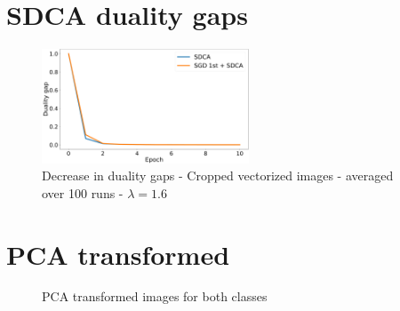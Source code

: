 \documentclass[10pt,a4paper]{article}
\begin{document}
\newpage

\FloatBarrier

\section{SDCA duality gaps}

\begin{figure}[!htb]
	\centering
	\includegraphics[width=0.55\textwidth]{Graphs/duality_original3_mc100.pdf}
  \caption{Decrease in duality gaps - Cropped vectorized images - averaged over 100 runs - $\lambda = 1.6$}\label{find_centre}
\end{figure}

\FloatBarrier
\section{PCA transformed}

\begin{figure}[!htb]
  \centering
  \hfill
  \caption{PCA transformed images for both classes}\label{pca_reduced}
\end{figure}
\end{document}
